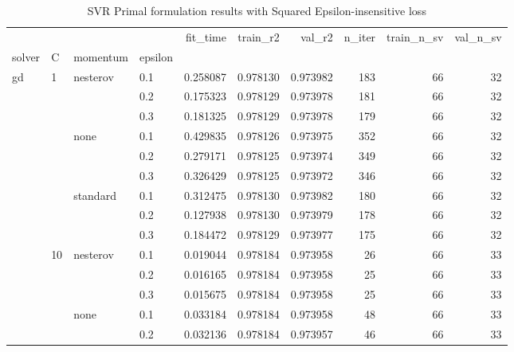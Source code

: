 \begin{table}[h!]
\centering
\caption{SVR Primal formulation results with Squared Epsilon-insensitive loss}
\label{primal_svr_squared_eps_cv_results}
\begin{tabular}{llllrrrrrr}
\toprule
          &     &   &     &  fit\_time &     train\_r2 &       val\_r2 &  n\_iter &  train\_n\_sv &  val\_n\_sv \\
solver & C & momentum & epsilon &           &              &              &         &             &           \\
\midrule
gd & 1   & nesterov & 0.1 &  0.258087 &     0.978130 &     0.973982 &     183 &          66 &        32 \\
          &     &   & 0.2 &  0.175323 &     0.978129 &     0.973978 &     181 &          66 &        32 \\
          &     &   & 0.3 &  0.181325 &     0.978129 &     0.973978 &     179 &          66 &        32 \\
          &     & none & 0.1 &  0.429835 &     0.978126 &     0.973975 &     352 &          66 &        32 \\
          &     &   & 0.2 &  0.279171 &     0.978125 &     0.973974 &     349 &          66 &        32 \\
          &     &   & 0.3 &  0.326429 &     0.978125 &     0.973972 &     346 &          66 &        32 \\
          &     & standard & 0.1 &  0.312475 &     0.978130 &     0.973982 &     180 &          66 &        32 \\
          &     &   & 0.2 &  0.127938 &     0.978130 &     0.973979 &     178 &          66 &        32 \\
          &     &   & 0.3 &  0.184472 &     0.978129 &     0.973977 &     175 &          66 &        32 \\
          & 10  & nesterov & 0.1 &  0.019044 &     0.978184 &     0.973958 &      26 &          66 &        33 \\
          &     &   & 0.2 &  0.016165 &     0.978184 &     0.973958 &      25 &          66 &        33 \\
          &     &   & 0.3 &  0.015675 &     0.978184 &     0.973958 &      25 &          66 &        33 \\
          &     & none & 0.1 &  0.033184 &     0.978184 &     0.973958 &      48 &          66 &        33 \\
          &     &   & 0.2 &  0.032136 &     0.978184 &     0.973957 &      46 &          66 &        33 \\

\end{tabular}
\end{table}
